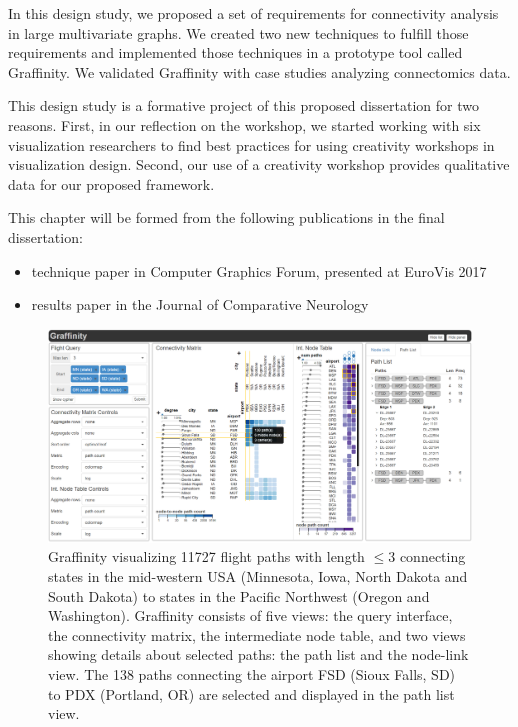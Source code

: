 In this design study, we proposed a set of requirements for connectivity analysis in large multivariate graphs. We created two new techniques to fulfill those requirements and implemented those techniques in a prototype tool called Graffinity. We validated Graffinity with case studies analyzing connectomics data.

This design study is a formative project of this proposed dissertation for two reasons. First, in our reflection on the workshop, we started working with six visualization researchers to find best practices for using creativity workshops in visualization design. Second, our use of a creativity workshop provides qualitative data for our proposed framework. 

This chapter will be formed from the following publications in the final dissertation:

\begin{itemize}
    \item technique paper in Computer Graphics Forum, presented at EuroVis 2017 ~\cite{Kerzner2017}
    \item results paper in the Journal of Comparative Neurology~\cite{Lauritzen2016}
\end{itemize}

\begin{figure}
 \includegraphics[width=\linewidth]{sources/figures/04_graffinity}
  \caption{Graffinity visualizing 11727 flight paths with length $\leq 3$ connecting states in the mid-western USA (Minnesota, Iowa, North Dakota and South Dakota) to states in the Pacific Northwest (Oregon and Washington). Graffinity consists of five views: the query interface, the connectivity matrix, the intermediate node table, and two views showing details about selected paths: the path list and the node-link view.  The 138 paths connecting the airport FSD (Sioux Falls, SD) to PDX (Portland, OR) are selected and displayed in the path list view.}
\label{fig:04_graffinity}
\end{figure}


